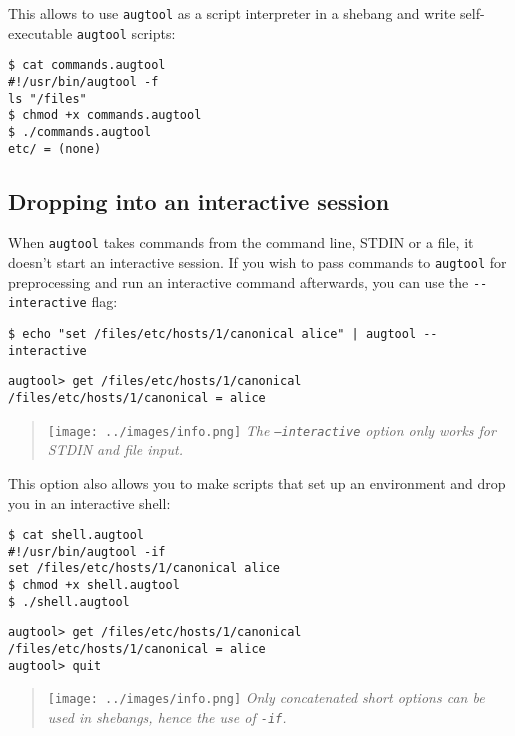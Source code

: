 This allows to use \verb!augtool! as a script interpreter in a shebang and write self-executable \verb!augtool! scripts:

\begin{verbatim}
$ cat commands.augtool
#!/usr/bin/augtool -f
ls "/files"
$ chmod +x commands.augtool
$ ./commands.augtool
etc/ = (none)
\end{verbatim}

\subsection{Dropping into an interactive session}

When \verb!augtool! takes commands from the command line, STDIN or a file, it doesn't start an interactive session. If you wish to pass commands to \verb!augtool! for preprocessing and run an interactive command afterwards, you can use the \verb!--interactive! flag:

  

\begin{verbatim}
$ echo "set /files/etc/hosts/1/canonical alice" | augtool --interactive
\end{verbatim}
\begin{verbatim}
augtool> get /files/etc/hosts/1/canonical
/files/etc/hosts/1/canonical = alice
\end{verbatim}

\begin{quote}
\texttt{[image: ../images/info.png]} \emph{The \texttt{--interactive} option only works for STDIN and file input.}

\end{quote}
This option also allows you to make scripts that set up an environment and drop you in an interactive shell:

   

\begin{verbatim}
$ cat shell.augtool
#!/usr/bin/augtool -if
set /files/etc/hosts/1/canonical alice
$ chmod +x shell.augtool
$ ./shell.augtool
\end{verbatim}
\begin{verbatim}
augtool> get /files/etc/hosts/1/canonical
/files/etc/hosts/1/canonical = alice
augtool> quit
\end{verbatim}

\begin{quote}
\texttt{[image: ../images/info.png]} \emph{Only concatenated short options can be used in shebangs, hence the use of \texttt{-if}.}
\end{quote}
